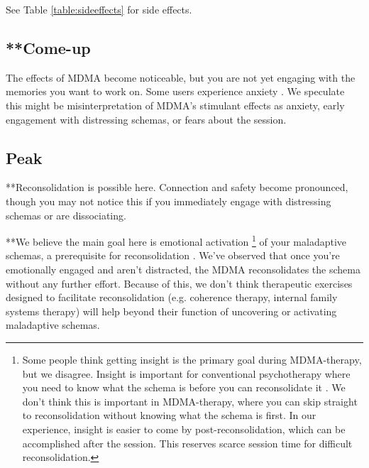 \documentclass[12pt,letterpaper]{book}
\begin{document}
See Table \ref{table:sideeffects} for side effects.

\subsection*{**Come-up}
The effects of MDMA become noticeable, but you are not yet engaging with the memories you want to work on. Some users experience anxiety \cite{hillsSolo}. We speculate this might be misinterpretation of MDMA's stimulant effects as anxiety, early engagement with distressing schemas, or fears about the session.

\subsection*{Peak}
**Reconsolidation is possible here. Connection and safety become pronounced, though you may not notice this if you immediately engage with distressing schemas or are dissociating.

**We believe the main goal here is emotional activation \footnote{Some people think getting insight is the primary goal during MDMA-therapy, but we disagree. Insight is important for conventional psychotherapy where you need to know what the schema is before you can reconsolidate it \cite{eckerUnlocking}. We don't think this is important in MDMA-therapy, where you can skip straight to reconsolidation without knowing what the schema is first. In our experience, insight is easier to come by post-reconsolidation, which can be accomplished after the session. This reserves scarce session time for difficult reconsolidation.} of your maladaptive schemas, a prerequisite for reconsolidation \cite{eckerUnlocking}. We've observed that once you're emotionally engaged and aren't distracted, the MDMA reconsolidates the schema without any further effort. Because of this, we don't think therapeutic exercises designed to facilitate reconsolidation (e.g. coherence therapy, internal family systems therapy) will help beyond their function of uncovering or activating maladaptive schemas.
\end{document}
